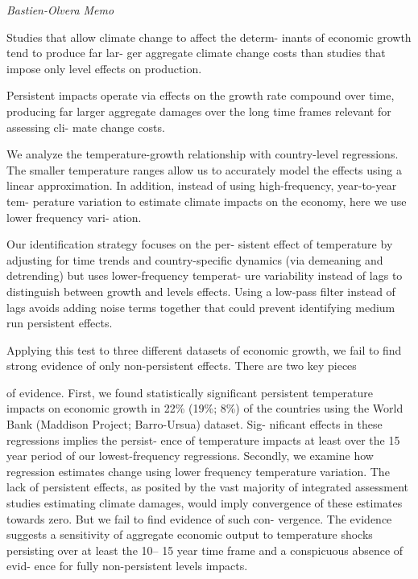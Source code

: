 \documentclass[
]{book}
\begin{document}
\emph{Bastien-Olvera Memo}

Studies that allow climate change to affect the determ-
inants of economic growth tend to produce far lar-
ger aggregate climate change costs than studies that
impose only level effects on production.

Persistent impacts
operate via effects on the growth rate compound
over time, producing far larger aggregate damages
over the long time frames relevant for assessing cli-
mate change costs.

We analyze the temperature-growth relationship with
country-level regressions. The smaller temperature
ranges allow us to accurately model the effects
using a linear approximation.
In addition,
instead of using high-frequency, year-to-year tem-
perature variation to estimate climate impacts on
the economy, here we use lower frequency vari-
ation.

Our identification strategy focuses on the per-
sistent effect of temperature by adjusting for time
trends and country-specific dynamics (via demeaning
and detrending) but uses lower-frequency temperat-
ure variability instead of lags to distinguish between
growth and levels effects. Using a low-pass filter
instead of lags avoids adding noise terms together
that could prevent identifying medium run persistent
effects.

Applying this test to three different datasets of
economic growth, we fail to find strong evidence of
only non-persistent effects. There are two key pieces

of evidence. First, we found statistically significant
persistent temperature impacts on economic growth
in 22\% (19\%; 8\%) of the countries using the World
Bank (Maddison Project; Barro-Ursua) dataset. Sig-
nificant effects in these regressions implies the persist-
ence of temperature impacts at least over the 15 year
period of our lowest-frequency regressions. Secondly,
we examine how regression estimates change using
lower frequency temperature variation. The lack of
persistent effects, as posited by the vast majority
of integrated assessment studies estimating climate
damages, would imply convergence of these estimates
towards zero. But we fail to find evidence of such con-
vergence.
The evidence
suggests a sensitivity of aggregate economic output
to temperature shocks persisting over at least the 10--
15 year time frame and a conspicuous absence of evid-
ence for fully non-persistent levels impacts.
\end{document}
